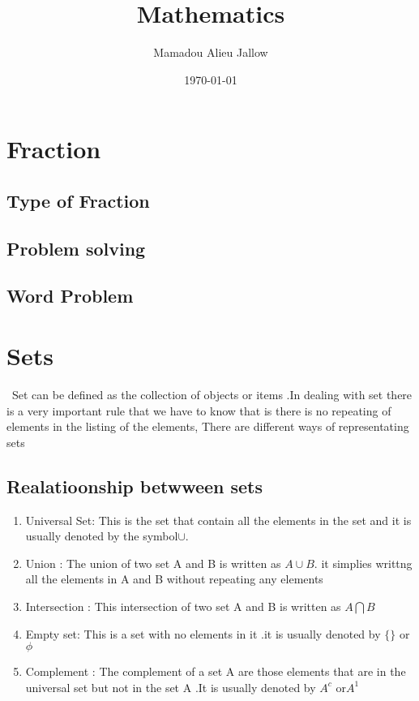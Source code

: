 \documentclass[15pt,a4paper]{article}
\begin{document}
\title{Mathematics}
\author{Mamadou Alieu Jallow}
\date{\today}
\maketitle
\tableofcontents
\section{Fraction}
\subsection{Type of Fraction}
\subsection{Problem solving }
\subsection{Word Problem}

\section{Sets}
\ Set can be defined as the collection of objects or items .In dealing with set there is a very important rule that we have to know that is there is no repeating of elements in the listing of the elements, There are different ways of representating sets

\subsection{Realatioonship betwween sets}
\begin{enumerate}
\item Universal Set: This is the set that contain all the elements in the set and it is usually denoted by the symbol$\cup $.

\item Union : The union of two set A and B is written as 
$A\cup B$. it simplies writtng all the elements in A and B without repeating any elements
\item Intersection : This intersection of two set A and B is written as 
$A\bigcap B$
\item Empty set: This is a set with no elements in it .it is usually denoted by 
$\lbrace\rbrace$ or $\phi$
\item Complement : The complement of a set A are those elements that are in the universal set but not in the set A .It is usually denoted by  $ A^{c}$ or$ A^{1}$ 
\end{enumerate}
\end{document}
